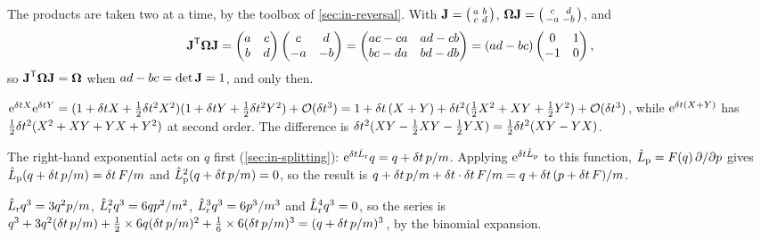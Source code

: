 The products are taken two at a time, by the
toolbox of \cref{sec:in-reversal}. With $\bm{\mathrm{J}} = \bigl(\begin{smallmatrix}
a & b\\ c & d\end{smallmatrix}\bigr)$, $\boldsymbol{\Omega}\bm{\mathrm{J}} = \bigl(
\begin{smallmatrix}c & d\\ -a & -b\end{smallmatrix}\bigr)$, and
\begin{equation*}
   \bm{\mathrm{J}}^{\mathsf T}\boldsymbol{\Omega}\bm{\mathrm{J}}
   = \begin{pmatrix} a & c\\ b & d\end{pmatrix}
   \begin{pmatrix} c & d\\ -a & -b\end{pmatrix}
   = \begin{pmatrix} ac - ca & ad - cb\\ bc - da & bd - db\end{pmatrix}
   = (ad - bc)\begin{pmatrix} 0 & 1\\ -1 & 0\end{pmatrix} ,
\end{equation*}
so $\bm{\mathrm{J}}^{\mathsf T}\boldsymbol{\Omega}\bm{\mathrm{J}} = \boldsymbol{\Omega}$ when
$ad - bc = \det\bm{\mathrm{J}} = 1$, and only then.

$\mathrm{e}^{\delta t X}\mathrm{e}^{\delta t Y} =
(1 + \delta t X + \frac12\delta t^2X^2)(1 + \delta t Y + \frac12\delta t^2Y^2) + \mathcal{O}(\delta t^3)
= 1 + \delta t\,(X + Y) + \delta t^2(\frac12X^2 + XY + \frac12Y^2) +
\mathcal{O}(\delta t^3)$, while $\mathrm{e}^{\delta t(X + Y)}$ has $\frac12\delta t^2(X^2 +
XY + YX + Y^2)$ at second order. The difference is $\delta t^2(XY - \frac12XY -
\frac12YX) = \frac12\delta t^2(XY - YX)$.

The right-hand exponential acts on $q$ first
(\cref{sec:in-splitting}): $\mathrm{e}^{\delta t\hat{L}_{\mathrm r}}q = q +
\delta t\,p/m$. Applying $\mathrm{e}^{\delta t\hat{L}_{\mathrm p}}$ to
this function, $\hat{L}_{\mathrm p} = F(q)\,\partial/\partial p$ gives
$\hat{L}_{\mathrm p}(q + \delta t\,p/m) = \delta t\,F/m$ and $\hat{L}_{\mathrm p}^2(q +
\delta t\,p/m) = 0$, so the result is $q + \delta t\,p/m + \delta t\cdot\delta t\,F/m = q +
\delta t\,(p + \delta t\,F)/m$.

$\hat{L}_{\mathrm r}q^3 = 3q^2p/m$,
$\hat{L}_{\mathrm r}^2q^3 = 6qp^2/m^2$, $\hat{L}_{\mathrm r}^3q^3 = 6p^3/m^3$
and $\hat{L}_{\mathrm r}^4q^3 = 0$, so the series is $q^3 + 3q^2(\delta t\,p/m) +
\frac12\times6q(\delta t\,p/m)^2 + \frac16\times6(\delta t\,p/m)^3 = (q + \delta t\,
p/m)^3$, by the binomial expansion.

